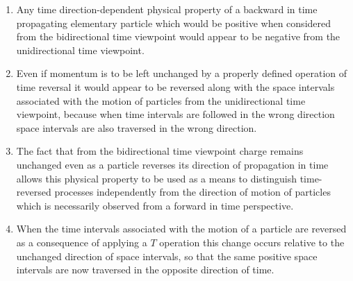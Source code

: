 \documentclass[notitlepage,12pt]{report}
\begin{document}
\begin{enumerate}
\item Any time direction-dependent physical property of a backward in time propagating elementary particle which would be positive when considered from the bidirectional time viewpoint would appear to be negative from the unidirectional time viewpoint.

\item Even if momentum is to be left unchanged by a properly defined operation of time reversal it would appear to be reversed along with the space intervals associated with the motion of particles from the unidirectional time viewpoint, because when time intervals are followed in the wrong direction space intervals are also traversed in the wrong direction.

\item The fact that from the bidirectional time viewpoint charge remains unchanged even as a particle reverses its direction of propagation in time allows this physical property to be used as a means to distinguish time-reversed processes independently from the direction of motion of particles which is necessarily observed from a forward in time perspective.

\item When the time intervals associated with the motion of a particle are reversed as a consequence of applying a $T$ operation this change occurs relative to the unchanged direction of space intervals, so that the same positive space intervals are now traversed in the opposite direction of time.


\end{enumerate}
\end{document}
